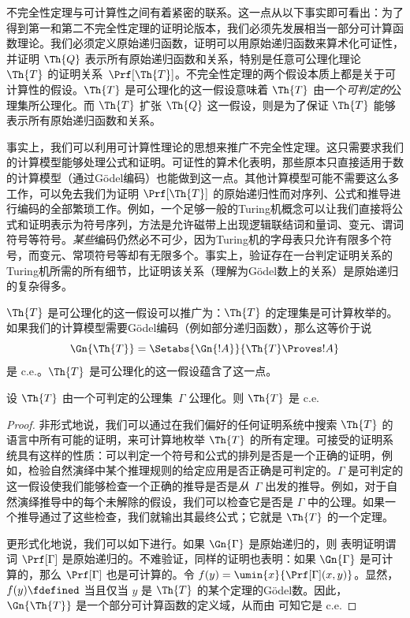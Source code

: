 \documentclass[../OpenLogic/include/open-logic-section]{subfiles}
\begin{document}

不完全性定理与可计算性之间有着紧密的联系。这一点从以下事实即可看出：为了得到第一和第二不完全性定理的证明论版本，我们必须先发展相当一部分可计算函数理论。我们必须定义原始递归函数，证明可以用原始递归函数来算术化可证性，并证明 $\Th{Q}$ 表示所有原始递归函数和关系，特别是任意可公理化理论~$\Th{T}$ 的证明关系~$\Prf[\Th{T}]$。不完全性定理的两个假设本质上都是关于可计算性的假设。$\Th{T}$ 是可公理化的这一假设意味着 $\Th{T}$ 由一个\emph{可判定的}公理集所公理化。而 $\Th{T}$ 扩张 $\Th{Q}$ 这一假设，则是为了保证 $\Th{T}$ 能够表示所有原始递归函数和关系。

事实上，我们可以利用可计算性理论的思想来推广不完全性定理。这只需要求我们的计算模型能够处理公式和证明。可证性的算术化表明，那些原本只直接适用于数的计算模型（通过Gödel编码）也能做到这一点。其他计算模型可能不需要这么多工作，可以免去我们为证明 $\Prf[\Th{T}]$ 的原始递归性而对序列、公式和推导进行编码的全部繁琐工作。例如，一个足够一般的Turing机概念可以让我们直接将公式和证明表示为符号序列，方法是允许磁带上出现逻辑联结词和量词、变元、谓词符号等符号。\emph{某些}编码仍然必不可少，因为Turing机的字母表只允许有限多个符号，而变元、常项符号等却有无限多个。事实上，验证存在一台判定证明关系的Turing机所需的所有细节，比证明该关系（理解为Gödel数上的关系）是原始递归的复杂得多。

$\Th{T}$ 是可公理化的这一假设可以推广为：$\Th{T}$ 的定理集是可计算枚举的。如果我们的计算模型需要Gödel编码（例如部分递归函数），那么这等价于说 \[
  \Gn{\Th{T}} = \Setabs{\Gn{!A}}{\Th{T} \Proves !A}
\] 是 c.e.\@。$\Th{T}$ 是可公理化的这一假设蕴含了这一点。

\begin{prop} 设 $\Th{T}$ 由一个可判定的公理集~$\Gamma$ 公理化。则 $\Th{T}$ 是 c.e.\@
\end{prop}

\begin{proof}
  非形式地说，我们可以通过在我们偏好的任何证明系统中搜索 $\Th{T}$ 的语言中所有可能的证明，来可计算地枚举 $\Th{T}$ 的所有定理。可接受的证明系统具有这样的性质：可以判定一个符号和公式的排列是否是一个正确的证明，例如，检验自然演绎中某个推理规则的给定应用是否正确是可判定的。$\Gamma$ 是可判定的这一假设使我们能够检查一个正确的推导是否是\emph{从}~$\Gamma$ 出发的推导。例如，对于自然演绎推导中的每个未解除的假设，我们可以检查它是否是 $\Gamma$ 中的公理。如果一个推导通过了这些检查，我们就输出其最终公式；它就是 $\Th{T}$ 的一个定理。

  更形式化地说，我们可以如下进行。如果 $\Gn{\Gamma}$ 是原始递归的，则  表明证明谓词 $\Prf[\Gamma]$ 是原始递归的。不难验证，同样的证明也表明：如果 $\Gn{\Gamma}$ 是可计算的，那么 $\Prf[\Gamma]$ 也是可计算的。令 $f(y) = \umin{x}{\Prf[\Gamma](x,y)}$。显然，$f(y)\fdefined$ 当且仅当 $y$ 是 $\Th{T}$ 的某个定理的Gödel数。因此，$\Gn{\Th{T}}$ 是一个部分可计算函数的定义域，从而由  可知它是 c.e.\@
\end{proof}
\end{document}
